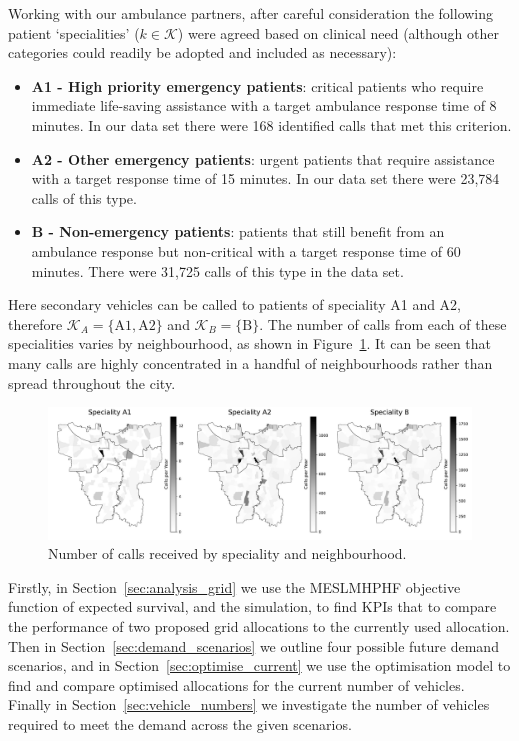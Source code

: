 \documentclass[preprint,12pt]{elsarticle}
\begin{document}
Working with our ambulance partners, after careful consideration the following
patient `specialities' ($k \in \mathcal{K}$) were agreed based on clinical need
(although other categories could readily be adopted and included as necessary):

\begin{itemize}
  \item \textbf{A1 - High priority emergency patients}: critical patients who
  require immediate life-saving assistance with a target ambulance response
  time of 8 minutes. In our data set there were 168 identified calls that met
  this criterion.
  \item \textbf{A2 - Other emergency patients}: urgent patients that require
  assistance with a target response time of 15 minutes. In our data set there
  were 23,784 calls of this type.
  \item \textbf{B - Non-emergency patients}: patients that still benefit from
  an ambulance response but non-critical with a target response time of 60
  minutes. There were 31,725 calls of this type in the data set.
\end{itemize}

Here secondary vehicles can be called to patients of speciality A1 and A2,
therefore $\mathcal{K}_A = \{\text{A1}, \text{A2}\}$ and
$\mathcal{K}_B = \{\text{B}\}$.
The number of calls from each of these specialities varies by neighbourhood,
as shown in Figure~\ref{fig:yearly_demand}. It can be seen that many calls are
highly concentrated in a handful of neighbourhoods rather than spread
throughout the city.

\begin{figure}
\begin{center}
\includegraphics[width=\textwidth]{img/yearly_demand.pdf}
\end{center}
\caption{Number of calls received by speciality and neighbourhood.}
\label{fig:yearly_demand}
\end{figure}


Firstly, in Section~\ref{sec:analysis_grid} we use the MESLMHPHF objective
function of expected survival, and the simulation, to find KPIs that to compare
the performance of two proposed grid allocations to the currently used
allocation. Then in Section~\ref{sec:demand_scenarios} we outline four possible
future demand scenarios, and in Section~\ref{sec:optimise_current} we use the
optimisation model to find and compare optimised allocations for the current
number of vehicles. Finally in Section~\ref{sec:vehicle_numbers} we investigate
the number of vehicles required to meet the demand across the given scenarios.
\end{document}
